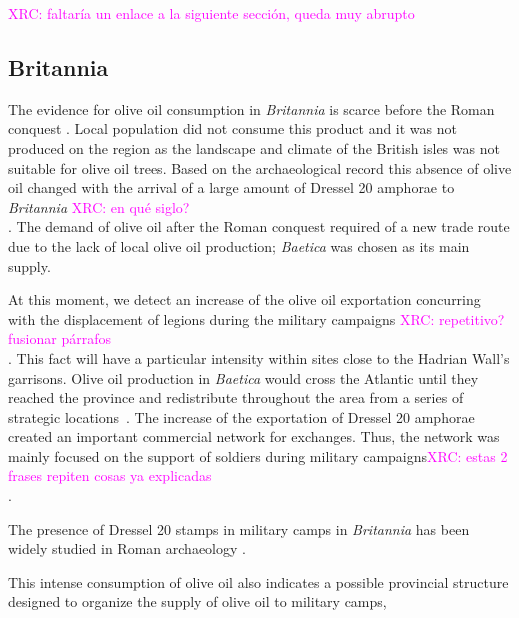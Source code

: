 \documentclass[review]{elsarticle}
\newcommand{\memo}[2]{\textcolor{#1}{#2}}
\newcommand{\xavi}[1]{\memo{magenta}{XRC: #1\\}}
\begin{document}
\xavi{faltaría un enlace a la siguiente sección, queda muy abrupto}


\subsection{Britannia}

The evidence for olive oil consumption in \textit{Britannia} is scarce before the Roman conquest \citep{funari_corpus_1996,carreras_abastecimiento_2003}. Local population did not consume this product and it was not produced on the region as the landscape and climate of the British isles was not suitable for olive oil trees\citep[161]{monfort_britanniaen_1998}. Based on the archaeological record this absence of olive oil changed with the arrival of a large amount of Dressel 20 amphorae to \textit{Britannia} \citep[1]{carreras_britannia_1998}\xavi{en qué siglo?}. The demand of olive oil after the Roman conquest required of a new trade route due to the lack of local olive oil production; \textit{Baetica} was chosen as its main supply.

At this moment, we detect an increase of the olive oil exportation concurring with the displacement of legions during the military campaigns \citep[161]{monfort_britanniaen_1998}\xavi{repetitivo? fusionar párrafos}. This fact will have a particular intensity within sites close to the Hadrian Wall's garrisons. Olive oil production in \textit{Baetica} would cross the Atlantic until they reached the province and redistribute throughout the area from a series of strategic locations~\citep{carreras_atlantic_2012}. The increase of the exportation of Dressel 20 amphorae created an important commercial network for exchanges. Thus, the network was mainly focused on the support of soldiers during military campaigns\xavi{estas 2 frases repiten cosas ya explicadas}. 


The presence of Dressel 20 stamps in military camps in \textit{Britannia} has been widely studied in Roman archaeology \citep{williams_importation_1983,
funari_corpus_1996,
carreras_britannia_1998,carreras_abastecimiento_2003}.%


This intense consumption of olive oil also indicates a possible provincial structure designed to organize the supply of olive oil to military camps, 

\end{document}
